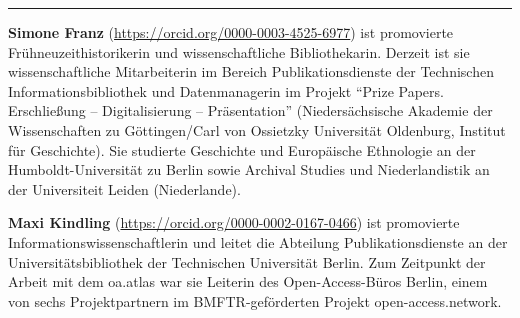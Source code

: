 \begin{center}\rule{0.5\linewidth}{0.5pt}\end{center}

\textbf{Simone Franz} (\url{https://orcid.org/0000-0003-4525-6977}) ist
promovierte Frühneuzeithistorikerin und wissenschaftliche
Bibliothekarin. Derzeit ist sie wissenschaftliche Mitarbeiterin im
Bereich Publikationsdienste der Technischen Informationsbibliothek und
Datenmanagerin im Projekt \enquote{Prize Papers. Erschließung --
Digitalisierung -- Präsentation} (Niedersächsische Akademie der
Wissenschaften zu Göttingen/Carl von Ossietzky Universität Oldenburg,
Institut für Geschichte). Sie studierte Geschichte und Europäische
Ethnologie an der Humboldt-Universität zu Berlin sowie Archival Studies
und Niederlandistik an der Universiteit Leiden (Niederlande).

\textbf{Maxi Kindling} (\url{https://orcid.org/0000-0002-0167-0466}) ist promovierte Informationswissenschaftlerin und
leitet die Abteilung Publikationsdienste an der Universitätsbibliothek
der Technischen Universität Berlin. Zum Zeitpunkt der Arbeit mit dem
oa.atlas war sie Leiterin des Open-Access-Büros Berlin, einem von sechs
Projektpartnern im BMFTR-geförderten Projekt open-access.network.
